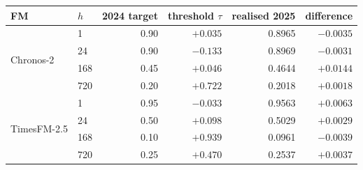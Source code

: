 \begin{tabular}{llrrrr}
\toprule
FM & $h$ & 2024 target & threshold $\tau$ & realised 2025 & difference \\
\midrule
\multirow{4}{*}{Chronos-2}
 & 1 & 0.90 & $+0.035$ & 0.8965 & $-0.0035$ \\
 & 24 & 0.90 & $-0.133$ & 0.8969 & $-0.0031$ \\
 & 168 & 0.45 & $+0.046$ & 0.4644 & $+0.0144$ \\
 & 720 & 0.20 & $+0.722$ & 0.2018 & $+0.0018$ \\
\midrule
\multirow{4}{*}{TimesFM-2.5}
 & 1 & 0.95 & $-0.033$ & 0.9563 & $+0.0063$ \\
 & 24 & 0.50 & $+0.098$ & 0.5029 & $+0.0029$ \\
 & 168 & 0.10 & $+0.939$ & 0.0961 & $-0.0039$ \\
 & 720 & 0.25 & $+0.470$ & 0.2537 & $+0.0037$ \\
\bottomrule
\end{tabular}
